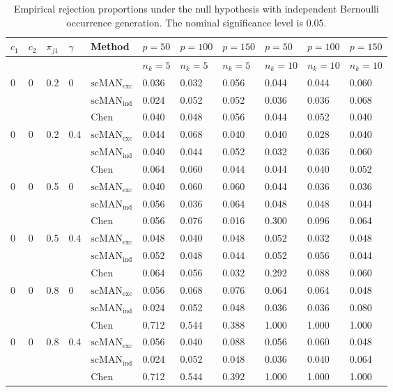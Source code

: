 \begin{table}[H]
\scriptsize
\centering
\caption{Empirical rejection proportions under the null hypothesis with independent Bernoulli occurrence generation. The nominal significance level is $0.05$.}
\label{tab:size-independent}
\begin{tabular}{lllllllllll}
\hline
$c_1$ & $c_2$ & $\pi_{j1}$ & $\gamma$ & Method & $p=50$ & $p=100$ & $p=150$ & $p=50$ & $p=100$ & $p=150$ \\
\hline
& & & & & $n_k=5$ & $n_k=5$ & $n_k=5$ & $n_k=10$ & $n_k=10$ & $n_k=10$ \\
0 & 0 & 0.2 & 0 & $\mathrm{scMAN}_{\mathrm{exc}}$ & 0.036 & 0.032 & 0.056 & 0.044 & 0.044 & 0.060 \\
 &  &  &  & $\mathrm{scMAN}_{\mathrm{ind}}$ & 0.024 & 0.052 & 0.052 & 0.036 & 0.036 & 0.068 \\
 &  &  &  & Chen & 0.040 & 0.048 & 0.056 & 0.044 & 0.052 & 0.040 \\
0 & 0 & 0.2 & 0.4 & $\mathrm{scMAN}_{\mathrm{exc}}$ & 0.044 & 0.068 & 0.040 & 0.040 & 0.028 & 0.040 \\
 &  &  &  & $\mathrm{scMAN}_{\mathrm{ind}}$ & 0.040 & 0.044 & 0.052 & 0.032 & 0.036 & 0.060 \\
 &  &  &  & Chen & 0.064 & 0.060 & 0.044 & 0.044 & 0.040 & 0.052 \\
0 & 0 & 0.5 & 0 & $\mathrm{scMAN}_{\mathrm{exc}}$ & 0.040 & 0.060 & 0.060 & 0.044 & 0.036 & 0.036 \\
 &  &  &  & $\mathrm{scMAN}_{\mathrm{ind}}$ & 0.056 & 0.036 & 0.064 & 0.048 & 0.048 & 0.044 \\
 &  &  &  & Chen & 0.056 & 0.076 & 0.016 & 0.300 & 0.096 & 0.064 \\
0 & 0 & 0.5 & 0.4 & $\mathrm{scMAN}_{\mathrm{exc}}$ & 0.048 & 0.040 & 0.048 & 0.052 & 0.032 & 0.048 \\
 &  &  &  & $\mathrm{scMAN}_{\mathrm{ind}}$ & 0.052 & 0.048 & 0.044 & 0.052 & 0.056 & 0.044 \\
 &  &  &  & Chen & 0.064 & 0.056 & 0.032 & 0.292 & 0.088 & 0.060 \\
0 & 0 & 0.8 & 0 & $\mathrm{scMAN}_{\mathrm{exc}}$ & 0.056 & 0.068 & 0.076 & 0.064 & 0.064 & 0.048 \\
 &  &  &  & $\mathrm{scMAN}_{\mathrm{ind}}$ & 0.024 & 0.052 & 0.048 & 0.036 & 0.036 & 0.080 \\
 &  &  &  & Chen & 0.712 & 0.544 & 0.388 & 1.000 & 1.000 & 1.000 \\
0 & 0 & 0.8 & 0.4 & $\mathrm{scMAN}_{\mathrm{exc}}$ & 0.056 & 0.040 & 0.088 & 0.056 & 0.060 & 0.048 \\
 &  &  &  & $\mathrm{scMAN}_{\mathrm{ind}}$ & 0.024 & 0.052 & 0.048 & 0.036 & 0.040 & 0.064 \\
 &  &  &  & Chen & 0.712 & 0.544 & 0.392 & 1.000 & 1.000 & 1.000 \\
\hline
\end{tabular}
\end{table}
